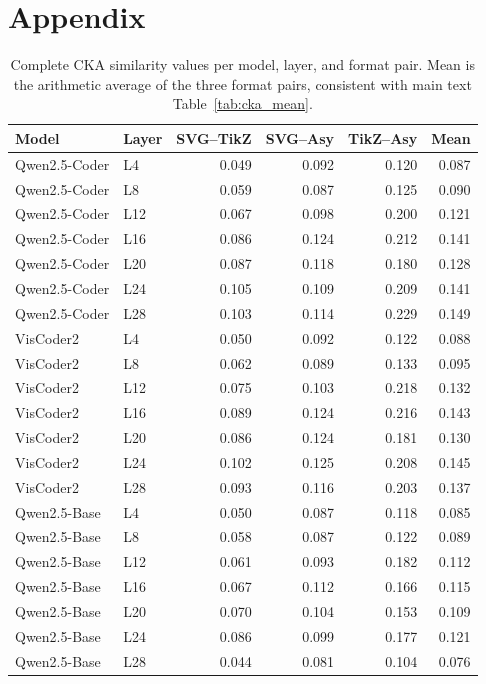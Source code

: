 \section*{Appendix}
\label{sec:appendix}

\setcounter{table}{0}
\renewcommand{\thetable}{A\arabic{table}}

\begin{table}[t]
\centering
\caption{Complete CKA similarity values per model, layer, and format pair. Mean is the arithmetic average of the three format pairs, consistent with main text Table~\ref{tab:cka_mean}.}
\label{tab:cka_complete}
\small
\begin{tabular}{ll rrrr}
\toprule
\textbf{Model} & \textbf{Layer} & \textbf{SVG--TikZ} & \textbf{SVG--Asy} & \textbf{TikZ--Asy} & \textbf{Mean} \\
\midrule
Qwen2.5-Coder & L4  & 0.049 & 0.092 & 0.120 & 0.087 \\
Qwen2.5-Coder & L8  & 0.059 & 0.087 & 0.125 & 0.090 \\
Qwen2.5-Coder & L12 & 0.067 & 0.098 & 0.200 & 0.121 \\
Qwen2.5-Coder & L16 & 0.086 & 0.124 & 0.212 & 0.141 \\
Qwen2.5-Coder & L20 & 0.087 & 0.118 & 0.180 & 0.128 \\
Qwen2.5-Coder & L24 & 0.105 & 0.109 & 0.209 & 0.141 \\
Qwen2.5-Coder & L28 & 0.103 & 0.114 & 0.229 & 0.149 \\
\midrule
VisCoder2      & L4  & 0.050 & 0.092 & 0.122 & 0.088 \\
VisCoder2      & L8  & 0.062 & 0.089 & 0.133 & 0.095 \\
VisCoder2      & L12 & 0.075 & 0.103 & 0.218 & 0.132 \\
VisCoder2      & L16 & 0.089 & 0.124 & 0.216 & 0.143 \\
VisCoder2      & L20 & 0.086 & 0.124 & 0.181 & 0.130 \\
VisCoder2      & L24 & 0.102 & 0.125 & 0.208 & 0.145 \\
VisCoder2      & L28 & 0.093 & 0.116 & 0.203 & 0.137 \\
\midrule
Qwen2.5-Base   & L4  & 0.050 & 0.087 & 0.118 & 0.085 \\
Qwen2.5-Base   & L8  & 0.058 & 0.087 & 0.122 & 0.089 \\
Qwen2.5-Base   & L12 & 0.061 & 0.093 & 0.182 & 0.112 \\
Qwen2.5-Base   & L16 & 0.067 & 0.112 & 0.166 & 0.115 \\
Qwen2.5-Base   & L20 & 0.070 & 0.104 & 0.153 & 0.109 \\
Qwen2.5-Base   & L24 & 0.086 & 0.099 & 0.177 & 0.121 \\
Qwen2.5-Base   & L28 & 0.044 & 0.081 & 0.104 & 0.076 \\
\bottomrule
\end{tabular}
\end{table}

